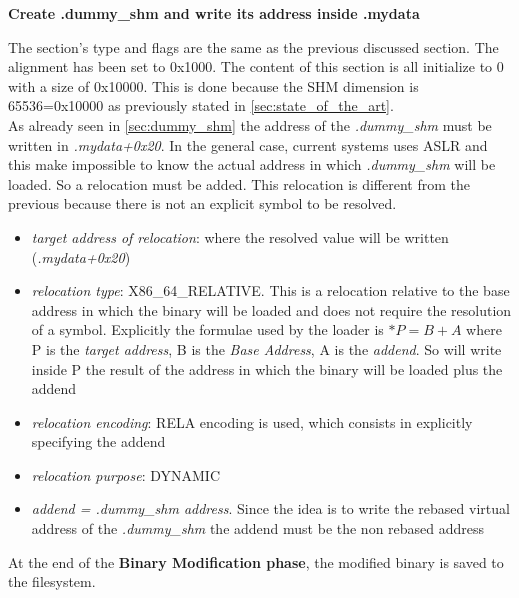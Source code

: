 \begin{center}
    \textbf{Create .dummy\_shm and write its address inside .mydata}
\end{center}
The section's type and flags are the same as the previous discussed section. The alignment has been set to 0x1000.
The content of this section is all initialize to 0 with a size of 0x10000. This is done because the \gls{SHM} dimension is 
65536=0x10000 as previously stated in \cref{sec:state_of_the_art}.\\
As already seen in \cref{sec:dummy_shm} the address of the \textit{.dummy\_shm} must be written in \textit{.mydata+0x20}.
In the general case, current systems uses \gls{ASLR} and this make impossible to know the actual address in which 
\textit{.dummy\_shm} will be loaded.
So a relocation must be added. This relocation is different from the previous because 
there is not an explicit symbol to be resolved.
\begin{itemize}
    \item \textit{target address of relocation}: where the resolved value will be written (\textit{.mydata+0x20})
    \item \textit{relocation type}: X86\_64\_RELATIVE. This is a relocation relative to the base address in which 
        the binary will be loaded and does not require the resolution of a symbol.
        Explicitly the formulae used by the loader is $*P = B + A$ where P is the  \textit{target address}, B is the 
        \textit{Base Address}, A is the \textit{addend}. So will write inside P the result of the address in which 
        the binary will be loaded plus the addend
    \item \textit{relocation encoding}: RELA encoding is used, which consists in explicitly specifying the addend
    \item \textit{relocation purpose}: DYNAMIC 
    \item \textit{addend = .dummy\_shm address}. Since the idea is to write the rebased virtual address of the \textit{.dummy\_shm} 
        the addend must be the non rebased address
\end{itemize}


At the end of the \textbf{Binary Modification phase}, the modified binary is saved to the filesystem.
